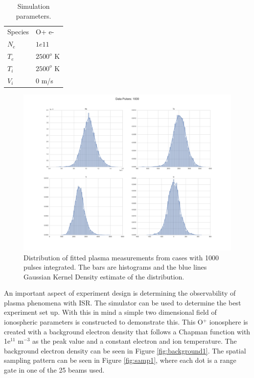 \documentclass[draft,ras]{agutex}
\begin{document}
\begin{article}
\begin{table}[!t]
\centering
\caption{Simulation parameters.}
\label{tb:param1}
\begin{tabular}{ll}
Species & O+ e-\\
$N_e$    & $1e11$ \\
$T_e$      & $2500^o$ K   \\
$T_i$      & $2500^o$ K \\
$V_i$      & $0$ m/s
\end{tabular}
\end{table}

\begin{figure}[!t]
\centering
\includegraphics[width=5in]{Data01000pulses}
\caption{Distribution of fitted plasma measurements from cases with 1000 pulses integrated. The bars are histograms and the blue lines Gaussian Kernel Density estimate of the distribution.}
\label{fig:statsdata}
\end{figure}

An important aspect of experiment design is determining the observability of plasma phenomena with ISR. The simulator can be used to determine the best experiment set up. With this in mind a simple two dimensional field of ionospheric parameters is constructed to demonstrate this. This O$^+$ ionosphere is created with a background electron density that follows a Chapman function with 1e$^11$ m$^{-3}$ as the peak value and a constant electron and ion temperature. The background electron density can be seen in Figure \ref{fig:background1}. The spatial sampling pattern can be seen in Figure \ref{fig:samp1}, where each dot is a range gate in one of the 25 beams used. 


\end{article}
\end{document}
